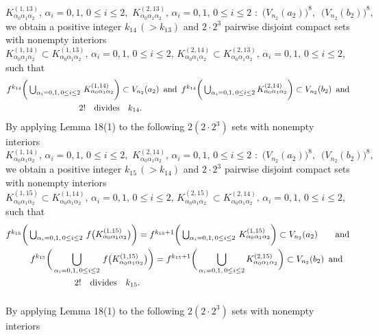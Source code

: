\documentclass[12pt]{article}
\newcommand{\al}{\alpha}
\begin{document}
$$
K_{\al_0\al_1\al_2}^{(1,13)}, \, \al_i = 0, 1, \, 0 \le i \le 2, \,\, K_{\al_0\al_1\al_2}^{(2,13)}, \, \al_i = 0, 1, \, 0 \le i \le 2 \,\, : \,\, \big(V_{n_2}(a_2)\big)^8, \,\,\, \big(V_{n_2}(b_2)\big)^8,
$$
we obtain a positive integer $k_{14} \, (> k_{13})$ and $2 \cdot 2^3$ pairwise disjoint compact sets with nonempty interiors $K_{\al_0\al_1\al_2}^{(1,14)} \subset K_{\al_0\al_1\al_2}^{(1,13)}, \, \al_i = 0, 1, \, 0 \le i \le 2, \, K_{\al_0\al_1\al_2}^{(2,14)} \subset K_{\al_0\al_1\al_2}^{(2,13)}, \, \al_i = 0, 1, \, 0 \le i \le 2$, such that 
\begin{multline*}
$$
f^{k_{14}}\bigg(\bigcup_{\al_i = 0, 1, \, 0 \le i \le 2} \, K_{\al_0\al_1\al_2}^{(1,14)}\bigg) \subset V_{n_2}(a_2) \,\,\, \text{and} \,\,\, f^{k_{14}}\bigg(\bigcup_{\al_i = 0, 1, \, 0 \le i \le 2} K_{\al_0\al_1\al_2}^{(2,14)}\bigg) \subset V_{n_2}(b_2) \,\,\, \text{and} \\ 
2! \quad \text{divides} \quad k_{14}. \qquad\qquad\qquad\qquad\qquad\qquad\qquad\qquad
$$
\end{multline*}
\indent By applying Lemma 18(1) to the following $2(2 \cdot 2^3)$ sets with nonempty interiors 
$$
K_{\al_0\al_1\al_2}^{(1,14)}, \, \al_i = 0, 1, \, 0 \le i \le 2, \,\, K_{\al_0\al_1\al_2}^{(2,14)}, \, \al_i = 0, 1, \, 0 \le i \le 2 \,\, : \,\, \big(V_{n_2}(a_2)\big)^8, \,\,\, \big(V_{n_2}(b_2)\big)^8,
$$
we obtain a positive integer $k_{15} \, (> k_{14})$ and $2 \cdot 2^3$ pairwise disjoint compact sets with nonempty interiors $K_{\al_0\al_1\al_2}^{(1,15)} \subset K_{\al_0\al_1\al_2}^{(1,14)}, \, \al_i = 0, 1, \, 0 \le i \le 2, \, K_{\al_0\al_1\al_2}^{(2,15)} \subset K_{\al_0\al_1\al_2}^{(2,14)}, \, \al_i = 0, 1, \, 0 \le i \le 2$, such that 
\begin{multline*}
$$
f^{k_{15}}\bigg(\bigcup_{\al_i = 0, 1, \, 0 \le i \le 2} \, f\big(K_{\al_0\al_1\al_2}^{(1,15)}\big)\bigg) = f^{k_{15}+1}\bigg(\bigcup_{\al_i = 0, 1, \, 0 \le i \le 2} \, K_{\al_0\al_1\al_2}^{(1,15)}\bigg) \subset V_{n_2}(a_2) \qquad \text{and} \\
\qquad f^{k_{15}}\bigg(\bigcup_{\al_i = 0, 1, \, 0 \le i \le 2} \, f\big(K_{\al_0\al_1\al_2}^{(1,15)}\big)\bigg) = f^{k_{15}+1}\bigg(\bigcup_{\al_i = 0, 1, \, 0 \le i \le 2} K_{\al_0\al_1\al_2}^{(2,15)}\bigg) \subset V_{n_2}(b_2) \,\,\, \text{and} \\ 2! \quad \text{divides} \quad k_{15}. \qquad\qquad\qquad\qquad\qquad\qquad\qquad\qquad\vspace{.15in}
$$
\end{multline*}
\indent By applying Lemma 18(1) to the following $2(2 \cdot 2^3)$ sets with nonempty interiors 
\end{document}
